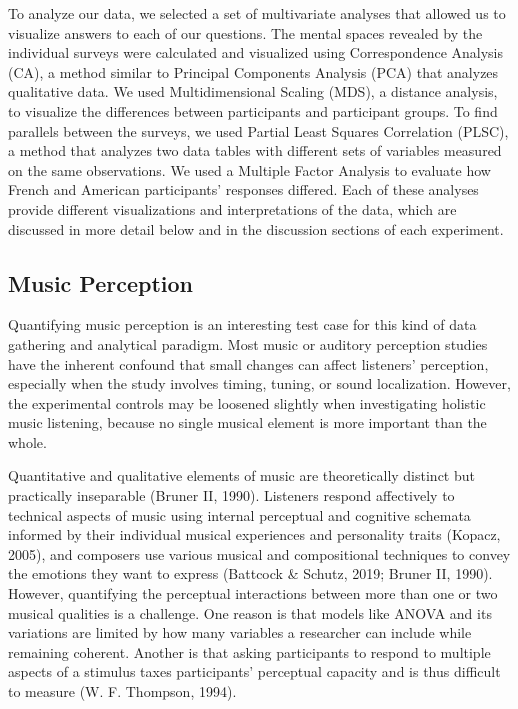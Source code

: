 \documentclass[
  english,
  man,floatsintext]{apa6}
\begin{document}
To analyze our data, we selected a set of multivariate analyses that allowed us to visualize answers to each of our questions. The mental spaces revealed by the individual surveys were calculated and visualized using Correspondence Analysis (CA), a method similar to Principal Components Analysis (PCA) that analyzes qualitative data. We used Multidimensional Scaling (MDS), a distance analysis, to visualize the differences between participants and participant groups. To find parallels between the surveys, we used Partial Least Squares Correlation (PLSC), a method that analyzes two data tables with different sets of variables measured on the same observations. We used a Multiple Factor Analysis to evaluate how French and American participants' responses differed. Each of these analyses provide different visualizations and interpretations of the data, which are discussed in more detail below and in the discussion sections of each experiment.

\hypertarget{music-perception}{%
\subsection{Music Perception}\label{music-perception}}

Quantifying music perception is an interesting test case for this kind of data gathering and analytical paradigm. Most music or auditory perception studies have the inherent confound that small changes can affect listeners' perception, especially when the study involves timing, tuning, or sound localization. However, the experimental controls may be loosened slightly when investigating holistic music listening, because no single musical element is more important than the whole.

Quantitative and qualitative elements of music are theoretically distinct but practically inseparable (Bruner II, 1990). Listeners respond affectively to technical aspects of music using internal perceptual and cognitive schemata informed by their individual musical experiences and personality traits (Kopacz, 2005), and composers use various musical and compositional techniques to convey the emotions they want to express (Battcock \& Schutz, 2019; Bruner II, 1990). However, quantifying the perceptual interactions between more than one or two musical qualities is a challenge. One reason is that models like ANOVA and its variations are limited by how many variables a researcher can include while remaining coherent. Another is that asking participants to respond to multiple aspects of a stimulus taxes participants' perceptual capacity and is thus difficult to measure (W. F. Thompson, 1994).
\end{document}
